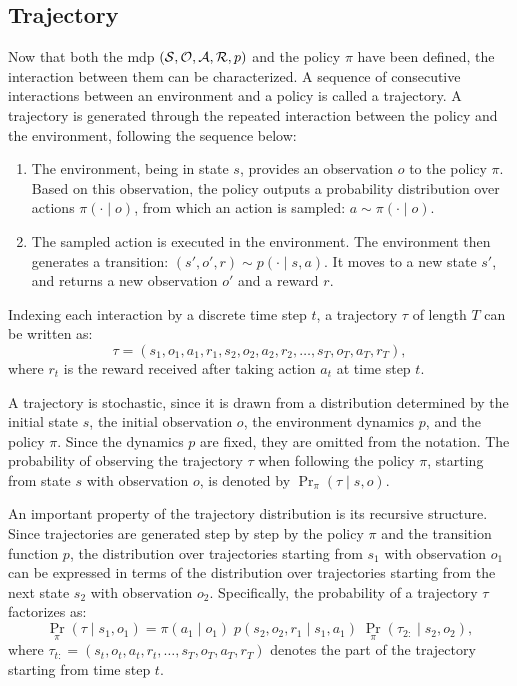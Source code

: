 \subsection{Trajectory}
\label{subsec:trajectory}

Now that both the \gls{mdp} \((\mathcal{S}, \mathcal{O}, \mathcal{A}, \mathcal{R}, p)\) and the policy \(\pi\) have been defined, the interaction between them can be characterized.  
A sequence of consecutive interactions between an environment and a policy is called a trajectory.  
A trajectory is generated through the repeated interaction between the policy and the environment, following the sequence below:
\begin{enumerate}
    \item The environment, being in state \(s\), provides an observation \(o\) to the policy \(\pi\).
    Based on this observation, the policy outputs a probability distribution over actions \(\pi(\cdot \mid o)\), from which an action is sampled:
    \(
    a \sim \pi(\cdot \mid o).
    \)

    \item The sampled action is executed in the environment. The environment then generates a transition:
    \(
    (s', o', r) \sim p(\cdot \mid s, a).
    \)
    It moves to a new state \(s'\), and returns a new observation \(o'\) and a reward \(r\).
\end{enumerate}

Indexing each interaction by a discrete time step \(t\), a trajectory \(\tau\) of length \(T\) can be written as:
\[
\tau = (s_1, o_1, a_1, r_1, s_2, o_2, a_2, r_2, \ldots, s_T, o_T, a_T, r_T),
\]
where \(r_t\) is the reward received after taking action \(a_t\) at time step \(t\).

A trajectory is stochastic, since it is drawn from a distribution determined by the initial state \(s\), the initial observation \(o\), the environment dynamics \(p\), and the policy \(\pi\).
Since the dynamics \(p\) are fixed, they are omitted from the notation.
The probability of observing the trajectory \(\tau\) when following the policy \(\pi\), starting from state \(s\) with observation \(o\), is denoted by \(\Pr_\pi(\tau \mid s, o)\).

An important property of the trajectory distribution is its recursive structure.
Since trajectories are generated step by step by the policy \(\pi\) and the transition function \(p\), the distribution over trajectories starting from \(s_1\) with observation \(o_1\) can be expressed in terms of the distribution over trajectories starting from the next state \(s_2\) with observation \(o_2\).
Specifically, the probability of a trajectory \(\tau\) factorizes as:
\[
\Pr_\pi(\tau \mid s_1, o_1) = \pi(a_1 \mid o_1) \; p(s_2, o_2, r_1 \mid s_1, a_1) \; \Pr_\pi(\tau_{2:} \mid s_2, o_2),
\]
where \(\tau_{t:} = (s_t, o_t, a_t, r_t, \ldots, s_T, o_T, a_T, r_T)\) denotes the part of the trajectory starting from time step \(t\).

